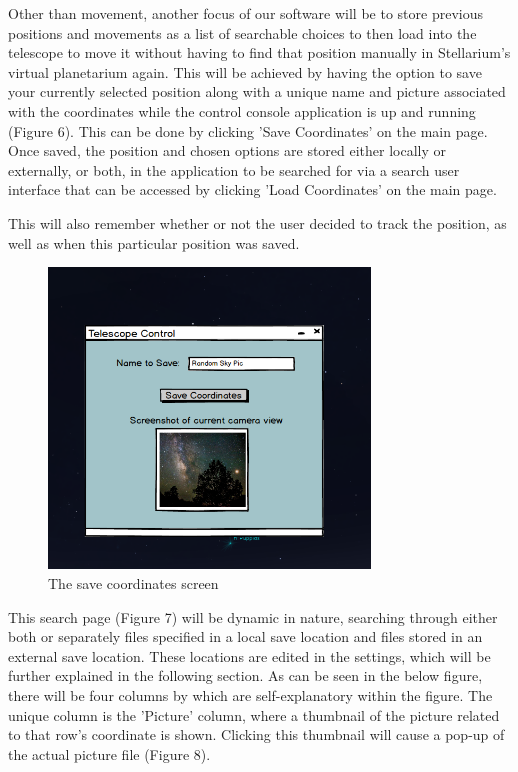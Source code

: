 \documentclass[12pt]{report}
\begin{document}
Other than movement, another focus of our software will be to store previous positions and movements as a list of searchable choices to then load into the telescope to move it without having to find that position manually in Stellarium's virtual planetarium again. This will be achieved by having the option to save your currently selected position along with a unique name and picture associated with the coordinates while the control console application is up and running (Figure 6). This can be done by clicking 'Save Coordinates' on the main page. Once saved, the position and chosen options are stored either locally or externally, or both, in the application to be searched for via a search user interface that can be accessed by clicking 'Load Coordinates' on the main page.

\newpage

This will also remember whether or not the user decided to track the position, as well as when this particular position was saved.


\begin{figure}[h]
	\centering
	\includegraphics[width=0.60\linewidth, height=8cm]{Save}
	\caption{The save coordinates screen}
\end{figure}

This search page (Figure 7) will be dynamic in nature, searching through either both or separately files specified in a local save location and files stored in an external save location. These locations are edited in the settings, which will be further explained in the following section. As can be seen in the below figure, there will be four columns by which are self-explanatory within the figure. The unique column is the 'Picture' column, where a thumbnail of the picture related to that row's coordinate is shown. Clicking this thumbnail will cause a pop-up of the actual picture file (Figure 8).
\end{document}
